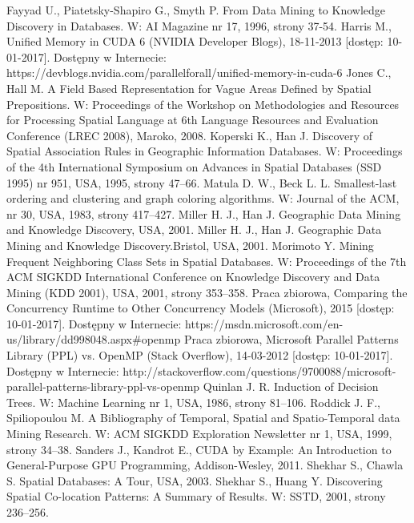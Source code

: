 \documentclass[12pt]{article}
\begin{document}
\begin{thebibliography}{}
Fayyad U., Piatetsky-Shapiro G., Smyth P. From Data Mining to Knowledge Discovery in Databases. W: AI Magazine nr 17, 1996, strony 37-54.
Harris M., Unified Memory in CUDA 6 (NVIDIA Developer Blogs), 18-11-2013 [dostęp: 10-01-2017]. Dostępny w Internecie: https://devblogs.nvidia.com/parallelforall/unified-memory-in-cuda-6
Jones C., Hall M. A Field Based Representation for Vague Areas Defined by Spatial Prepositions. W: Proceedings of the Workshop on Methodologies and Resources for Processing Spatial Language at 6th Language Resources and Evaluation Conference (LREC 2008), Maroko, 2008.
Koperski K., Han J. Discovery of Spatial Association Rules in Geographic Information Databases. W: Proceedings of the 4th International Symposium on Advances in Spatial Databases (SSD 1995) nr 951, USA, 1995, strony 47–66.
Matula D. W., Beck L. L. Smallest-last ordering and clustering and graph coloring algorithms. W: Journal of the ACM, nr 30, USA, 1983, strony 417–427.
Miller H. J., Han J. Geographic Data Mining and Knowledge Discovery, USA, 2001.
Miller H. J., Han J. Geographic Data Mining and Knowledge Discovery.Bristol, USA, 2001.
Morimoto Y. Mining Frequent Neighboring Class Sets in Spatial Databases. W: Proceedings of the 7th ACM SIGKDD International Conference on Knowledge Discovery and Data Mining (KDD 2001), USA, 2001, strony 353–358.
Praca zbiorowa, Comparing the Concurrency Runtime to Other Concurrency Models (Microsoft), 2015 [dostęp: 10-01-2017]. Dostępny w Internecie: https://msdn.microsoft.com/en-us/library/dd998048.aspx\#openmp
Praca zbiorowa, Microsoft Parallel Patterns Library (PPL) vs. OpenMP (Stack Overflow), 14-03-2012 [dostęp: 10-01-2017]. Dostępny w Internecie: http://stackoverflow.com/questions/9700088/microsoft-parallel-patterns-library-ppl-vs-openmp
Quinlan J. R. Induction of Decision Trees. W: Machine Learning nr 1, USA, 1986, strony 81–106.
Roddick J. F., Spiliopoulou M. A Bibliography of Temporal, Spatial and Spatio-Temporal data Mining Research. W: ACM SIGKDD Exploration Newsletter nr 1, USA, 1999, strony 34–38.
Sanders J., Kandrot E., CUDA by Example: An Introduction to General-Purpose GPU Programming, Addison-Wesley, 2011.
Shekhar S., Chawla S. Spatial Databases: A Tour, USA, 2003.
Shekhar S., Huang Y. Discovering Spatial Co-location Patterns: A Summary of Results. W: SSTD, 2001, strony 236–256.

\end{thebibliography}
\end{document}
